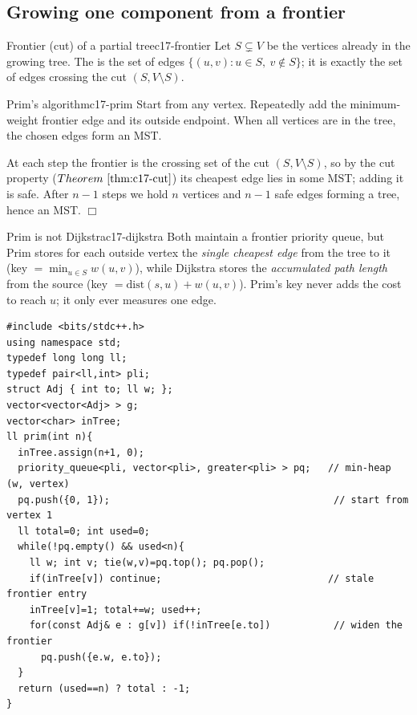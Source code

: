 \subsection{Growing one component from a frontier}

\begin{definition}{Frontier (cut) of a partial tree}{c17-frontier}
Let \(S\subsetneq V\) be the vertices already in the growing tree.  The
 is the set of edges \(\{(u,v): u\in S,\ v\notin S\}\); it is
exactly the set of edges crossing the cut \((S, V\setminus S)\).
\end{definition}

\begin{theorem}{Prim's algorithm}{c17-prim}
Start from any vertex.  Repeatedly add the minimum-weight frontier edge and its
outside endpoint.  When all vertices are in the tree, the chosen edges form an
MST.
\end{theorem}

\begin{proofbox}
At each step the frontier is the crossing set of the cut \((S,V\setminus S)\), so
by the cut property (\(\thmref{c17-cut}\)) its cheapest edge lies in some MST;
adding it is safe.  After \(n-1\) steps we hold \(n\) vertices and \(n-1\) safe
edges forming a tree, hence an MST. \(\Box\)
\end{proofbox}

\begin{lemma}{Prim is not Dijkstra}{c17-dijkstra}
Both maintain a frontier priority queue, but Prim stores for each outside vertex
the \emph{single cheapest edge} from the tree to it (key \(=\min_{u\in S} w(u,v)\)),
while Dijkstra stores the \emph{accumulated path length} from the source
(key \(=\mathrm{dist}(s,u)+w(u,v)\)).  Prim's key never adds the cost to reach
\(u\); it only ever measures one edge.
\end{lemma}

\begin{lstlisting}[caption={Prim with a binary heap. Push (weight, to) neighbours of each newly added vertex; lazily skip stale entries whose endpoint is already in the tree. Costs O(m log n). Returns MST weight and edge count}, label={lst:c17-prim}]
#include <bits/stdc++.h>
using namespace std;
typedef long long ll;
typedef pair<ll,int> pli;
struct Adj { int to; ll w; };
vector<vector<Adj> > g;
vector<char> inTree;
ll prim(int n){
  inTree.assign(n+1, 0);
  priority_queue<pli, vector<pli>, greater<pli> > pq;   // min-heap (w, vertex)
  pq.push({0, 1});                                       // start from vertex 1
  ll total=0; int used=0;
  while(!pq.empty() && used<n){
    ll w; int v; tie(w,v)=pq.top(); pq.pop();
    if(inTree[v]) continue;                             // stale frontier entry
    inTree[v]=1; total+=w; used++;
    for(const Adj& e : g[v]) if(!inTree[e.to])           // widen the frontier
      pq.push({e.w, e.to});
  }
  return (used==n) ? total : -1;
}
\end{lstlisting}

